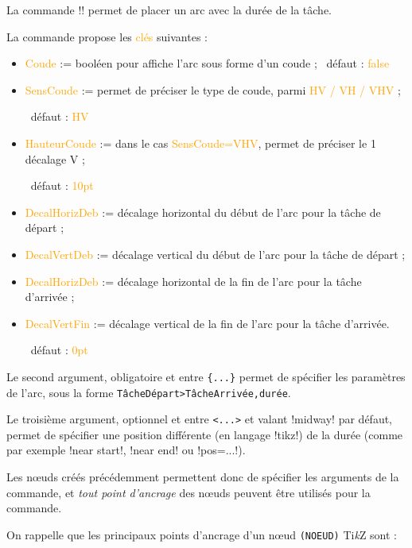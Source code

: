 \documentclass[french,a4paper,11pt]{article}
\providecommand\tikzlogo{Ti\textit{k}Z}
\let\TikZ\tikzlogo
\newcommand\Cle[1]{{\small\sffamily\textlangle \textcolor{orange}{#1}\textrangle}}
\begin{document}
{\begin{tipblock}
La commande \motcletex!\MPMPlaceDuree! permet de placer un arc avec la durée de la tâche.

\smallskip

La commande propose les \Cle{clés} suivantes :

\begin{itemize}
	\item \Cle{Coude} := booléen pour affiche l'arc sous forme d'un coude ; \hfill~défaut : \Cle{false}
	\item \Cle{SensCoude} := permet de préciser le type de coude, parmi \Cle{HV / VH / VHV} ;
	
	\hfill~défaut : \Cle{HV}
	\item \Cle{HauteurCoude} := dans le cas \Cle{SensCoude=VHV}, permet de préciser le 1\ier{} décalage V ;
	
	\hfill~défaut : \Cle{10pt}
	\item \Cle{DecalHorizDeb} := décalage horizontal du début de l'arc pour la tâche de départ ;
	\item \Cle{DecalVertDeb} := décalage vertical du début de l'arc pour la tâche de départ ;
	\item \Cle{DecalHorizDeb} := décalage horizontal de la fin de l'arc pour la tâche d'arrivée ;
	\item \Cle{DecalVertFin} := décalage vertical de la fin de l'arc pour la tâche d'arrivée.
	
	\hfill~défaut : \Cle{0pt}
\end{itemize}

Le second argument, obligatoire et entre \texttt{\{...\}} permet de spécifier les paramètres de l'arc, sous la forme \verb!TâcheDépart>TâcheArrivée,durée!.

\smallskip

Le troisième argument, optionnel et entre \texttt{<...>} et valant \motcletex!midway! par défaut, permet de spécifier une position différente (en langage \packagetex!tikz!) de la durée (comme par exemple \motcletex!near start!, \motcletex!near end! ou \motcletex!pos=...!).
\end{tipblock}

\begin{noteblock}
Les nœuds créés précédemment permettent donc de spécifier les arguments de la commande, et \textit{tout point d'ancrage} des nœuds peuvent être utilisés pour la commande.

\smallskip

On rappelle que les principaux points d'ancrage d'un nœud \verb!(NOEUD)! \TikZ{} sont :


\end{noteblock}}
\end{document}
